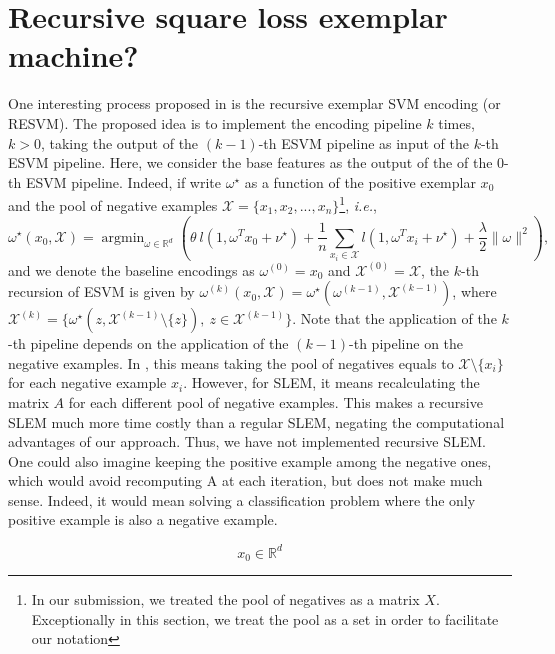 \documentclass[runningheads]{llncs}
\newcommand{\RR}{\mathbb R}
\newcommand{\NNN}{\mathcal X}
\DeclareMathOperator*{\argmin}{argmin}
\begin{document}
\section{Recursive square loss exemplar machine?} \label{RSLEM}
One interesting process proposed in \cite{ZePe15} is the recursive exemplar SVM encoding (or RESVM). The proposed idea is to implement the encoding pipeline $k$ times, $k>0$, taking the output of the $(k-1)$-th ESVM pipeline as input of the $k$-th ESVM pipeline. Here, we consider the base features as the output of the of the 0-th ESVM pipeline. 
Indeed, if write $\omega^\star$ as a function of the positive exemplar $x_0$ and the pool of negative examples $\NNN=\{x_1,x_2,...,x_n\}$\footnote{In our submission, we treated the pool of negatives as a matrix $X$. Exceptionally in this section, we treat the pool as a set in order to facilitate our notation}, \emph{i.e.}, 
\begin{equation}
\omega^\star(x_0, \NNN) = \argmin_{\omega\in\RR^d} \left(\theta \ l(1, \omega^Tx_0+\nu^\star) +\dfrac{1}{n}\sum_{x_i\in\NNN}l(1, \omega^Tx_i+\nu^\star)+\dfrac{\lambda}{2}\|\omega\|^2\right),
\end{equation}
and we denote the baseline encodings as $\omega^{(0)}=x_0$ and $\NNN^{(0)}=\NNN$,
the $k$-th recursion of ESVM is given by $\omega^{(k)}(x_0, \NNN) = \omega^\star (\omega^{(k-1)}, \NNN^{(k-1)})$, where $\NNN^{(k)} = \{\omega^\star(z, \NNN^{(k-1)}\setminus \{z\}), \ z\in\NNN^{(k-1)} \}$.
Note that the application of the $k$-th pipeline depends on the application of the $(k-1)$-th pipeline on the negative examples. In \cite{ZePe15}, this means taking the pool of negatives equals to $\NNN \setminus \{x_i\}$ for each negative example $x_i$. However, for SLEM, it means recalculating the matrix $A$ for each different pool of negative examples. This makes a recursive SLEM much more time costly than a regular SLEM, negating the computational advantages of 
our approach. Thus, we have not implemented recursive SLEM. One could 
also imagine keeping the positive example among the negative ones, which 
would avoid recomputing A at each iteration, but does not make much sense. Indeed, it would mean solving a classification problem where the only positive example is also a negative example.



\begin{equation}
    x_0\in \RR^d
\end{equation}

 

\end{document}
